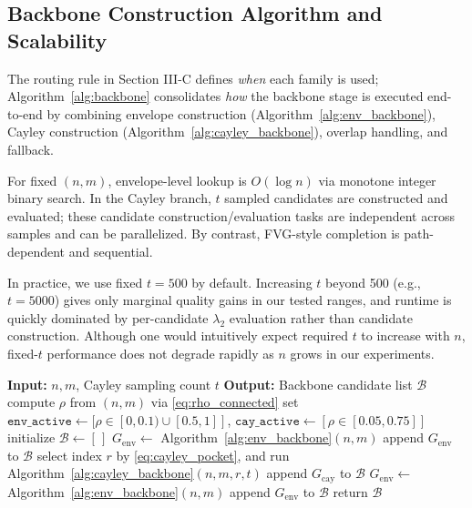 \documentclass[letterpaper, 10 pt, conference]{ieeeconf}  %
\newcommand{\1}{\mathbf{1}}
\newcommand{\0}{\mathbf{0}}
\begin{document}
\subsection{Backbone Construction Algorithm and Scalability}
The routing rule in Section III-C defines \emph{when} each family is used; Algorithm~\ref{alg:backbone} consolidates \emph{how} the backbone stage is executed end-to-end by combining envelope construction (Algorithm~\ref{alg:env_backbone}), Cayley construction (Algorithm~\ref{alg:cayley_backbone}), overlap handling, and fallback.

For fixed \((n,m)\), envelope-level lookup is \(O(\log n)\) via monotone integer binary search. In the Cayley branch, \(t\) sampled candidates are constructed and evaluated; these candidate construction/evaluation tasks are independent across samples and can be parallelized. By contrast, FVG-style completion is path-dependent and sequential.

In practice, we use fixed \(t=500\) by default. Increasing \(t\) beyond 500 (e.g., \(t=5000\)) gives only marginal quality gains in our tested ranges, and runtime is quickly dominated by per-candidate \(\lambda_2\) evaluation rather than candidate construction. Although one would intuitively expect required \(t\) to increase with \(n\), fixed-\(t\) performance does not degrade rapidly as \(n\) grows in our experiments.

\begin{algorithm}[t]
\caption{Density-Dependent Backbone Construction}
\label{alg:backbone}
\begin{algorithmic}[1]
\State \textbf{Input:} \(n,m\), Cayley sampling count \(t\)
\State \textbf{Output:} Backbone candidate list \(\mathcal B\)
\State compute \(\rho\) from \((n,m)\) via \eqref{eq:rho_connected}
\State set \(\texttt{env\_active}\leftarrow[\rho\in[0,0.1)\cup[0.5,1]]\), \(\texttt{cay\_active}\leftarrow[\rho\in[0.05,0.75]]\)
\State initialize \(\mathcal B\leftarrow[\,]\)
\State \(G_{\mathrm{env}}\leftarrow\) Algorithm~\ref{alg:env_backbone}\((n,m)\)
\State append \(G_{\mathrm{env}}\) to \(\mathcal B\)
\EndIf
{}
\State select index \(r\) by \eqref{eq:cayley_pocket}, and run Algorithm~\ref{alg:cayley_backbone}\((n,m,r,t)\)
\State append \(G_{\mathrm{cay}}\) to \(\mathcal B\)
\EndIf
\EndIf
{}
\State \(G_{\mathrm{env}}\leftarrow\) Algorithm~\ref{alg:env_backbone}\((n,m)\) 
\State append \(G_{\mathrm{env}}\) to \(\mathcal B\)
\EndIf
\State return \(\mathcal B\)
\end{algorithmic}
\end{algorithm}
\end{document}
